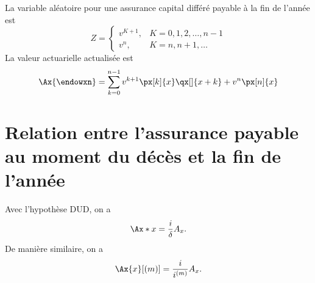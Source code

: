 \begin{definition}{}{}
	La variable aléatoire pour une assurance capital différé payable à la fin de l'année est 
	$$Z = \begin{cases}
	v^{K + 1}, & K = 0, 1, 2, \dots, n-1\\
	v^n, & K = n, n+1, \dots
	\end{cases}$$
	La valeur actuarielle actualisée est 
	$$\Ax{\endowxn} = \sum_{k = 0}^{n-1}v^{k+1}\px[k]{x}\qx[]{x+k} + v^n \px[n]{x}$$
\end{definition}

\section{Relation entre l'assurance payable au moment du décès et la fin de l'année}

Avec l'hypothèse DUD, on a 
$$\Ax*{x} = \frac{i}{\delta}A_x.$$
De manière similaire, on a 
$$\Ax{x}[(m)] = \frac{i}{i^{(m)}}A_x.$$


